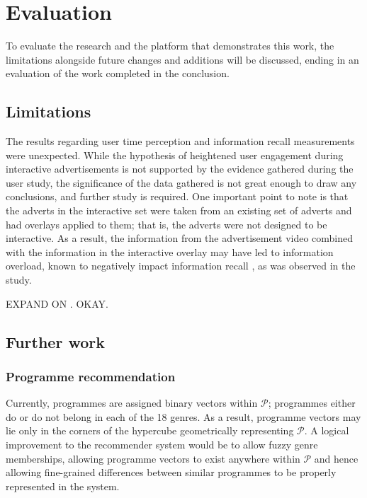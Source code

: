 \section{Evaluation}
	To evaluate the research and the platform that demonstrates this work, the limitations alongside future changes and additions will be discussed, ending in an evaluation of the work completed in the conclusion.
	\subsection{Limitations}

	The results regarding user time perception and information recall measurements were unexpected. While the hypothesis of heightened user engagement during interactive advertisements is not supported by the evidence gathered during the user study, the significance of the data gathered is not great enough to draw any conclusions, and further study is required. One important point to note is that the adverts in the interactive set were taken from an existing set of adverts and had overlays applied to them; that is, the adverts were not designed to be interactive. As a result, the information from the advertisement video combined with the information in the interactive overlay may have led to information overload, known to negatively impact information recall \cite{divided_attention}, as was observed in the study.

	EXPAND ON \cite{divided_attention}.
	OKAY.

	\subsection{Further work}
		\subsubsection{Programme recommendation}
		\label{sec:further_work_recommender}

		Currently, programmes are assigned binary vectors within $\mathcal{P}$; programmes either do or do not belong in each of the 18 genres. As a result, programme vectors may lie only in the corners of the hypercube geometrically representing $\mathcal{P}$. A logical improvement to the recommender system would be to allow fuzzy genre memberships, allowing programme vectors to exist anywhere within $\mathcal{P}$ and hence allowing fine-grained differences between similar programmes to be properly represented in the system.
		
